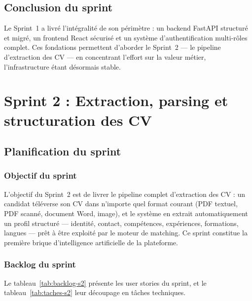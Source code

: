 \documentclass[12pt,a4paper]{report}
\begin{document}
\subsection{Conclusion du sprint}

Le Sprint~1 a livré l'intégralité de son périmètre : un backend FastAPI structuré et migré, un frontend React sécurisé et un système d'authentification multi-rôles complet. Ces fondations permettent d'aborder le Sprint~2 --- le pipeline d'extraction des CV --- en concentrant l'effort sur la valeur métier, l'infrastructure étant désormais stable.

\section{Sprint 2 : Extraction, parsing et structuration des CV}

\subsection{Planification du sprint}

\subsubsection{Objectif du sprint}

L'objectif du Sprint~2 est de livrer le pipeline complet d'extraction des CV : un candidat téléverse son CV dans n'importe quel format courant (PDF textuel, PDF scanné, document Word, image), et le système en extrait automatiquement un profil structuré --- identité, contact, compétences, expériences, formations, langues --- prêt à être exploité par le moteur de matching. Ce sprint constitue la première brique d'intelligence artificielle de la plateforme.

\subsubsection{Backlog du sprint}

Le tableau~\ref{tab:backlog-s2} présente les user stories du sprint, et le tableau~\ref{tab:taches-s2} leur découpage en tâches techniques.
\end{document}
